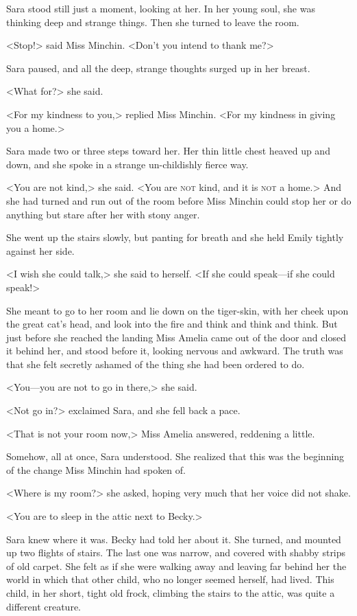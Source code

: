 Sara stood still just a moment, looking at her. In her young soul, she was thinking deep and strange things. Then she turned to leave the room.

<Stop!> said Miss Minchin. <Don't you intend to thank me?>

Sara paused, and all the deep, strange thoughts surged up in her breast.

<What for?> she said.

<For my kindness to you,> replied Miss Minchin. <For my kindness in giving you a home.>

Sara made two or three steps toward her. Her thin little chest heaved up and down, and she spoke in a strange un-childishly fierce way.

<You are not kind,> she said. <You are \textsc{not} kind, and it is \textsc{not} a home.> And she had turned and run out of the room before Miss Minchin could stop her or do anything but stare after her with stony anger.

She went up the stairs slowly, but panting for breath and she held Emily tightly against her side.

<I wish she could talk,> she said to herself. <If she could speak—if she could speak!>

She meant to go to her room and lie down on the tiger-skin, with her cheek upon the great cat's head, and look into the fire and think and think and think. But just before she reached the landing Miss Amelia came out of the door and closed it behind her, and stood before it, looking nervous and awkward. The truth was that she felt secretly ashamed of the thing she had been ordered to do.

<You—you are not to go in there,> she said.

<Not go in?> exclaimed Sara, and she fell back a pace.

<That is not your room now,> Miss Amelia answered, reddening a little.

Somehow, all at once, Sara understood. She realized that this was the beginning of the change Miss Minchin had spoken of.

<Where is my room?> she asked, hoping very much that her voice did not shake.

<You are to sleep in the attic next to Becky.>

Sara knew where it was. Becky had told her about it. She turned, and mounted up two flights of stairs. The last one was narrow, and covered with shabby strips of old carpet. She felt as if she were walking away and leaving far behind her the world in which that other child, who no longer seemed herself, had lived. This child, in her short, tight old frock, climbing the stairs to the attic, was quite a different creature.

